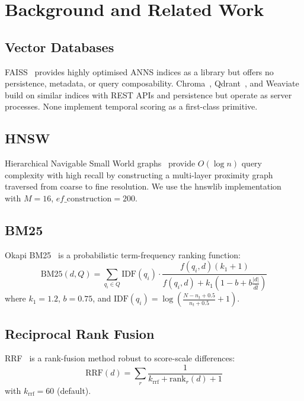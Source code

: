 \documentclass[11pt,twocolumn]{article}
\begin{document}
\section{Background and Related Work}
\label{sec:related}

\subsection{Vector Databases}

FAISS~\citep{johnson2019} provides highly optimised ANNS indices as a library but
offers no persistence, metadata, or query composability. Chroma~\citep{chroma2022},
Qdrant~\citep{qdrant2021}, and Weaviate~\citep{weaviate2021} build on similar
indices with REST APIs and persistence but operate as server processes.
None implement temporal scoring as a first-class primitive.

\subsection{HNSW}

Hierarchical Navigable Small World graphs~\citep{malkov2018} provide $O(\log n)$
query complexity with high recall by constructing a multi-layer proximity graph
traversed from coarse to fine resolution. We use the hnswlib
implementation~\citep{hnswlib} with $M=16$, $ef\_\text{construction}=200$.

\subsection{BM25}

Okapi BM25~\citep{robertson2009} is a probabilistic term-frequency ranking function:
\begin{equation}
  \text{BM25}(d,Q) = \sum_{q_i \in Q} \text{IDF}(q_i) \cdot
  \frac{f(q_i,d)(k_1+1)}{f(q_i,d)+k_1\!\left(1-b+b\frac{|d|}{\overline{dl}}\right)}
  \label{eq:bm25}
\end{equation}
where $k_1=1.2$, $b=0.75$, and $\text{IDF}(q_i)=\log\!\left(\frac{N-n_t+0.5}{n_t+0.5}+1\right)$.

\subsection{Reciprocal Rank Fusion}

RRF~\citep{cormack2009} is a rank-fusion method robust to score-scale differences:
\begin{equation}
  \text{RRF}(d) = \sum_r \frac{1}{k_{\text{rrf}} + \text{rank}_r(d) + 1}
  \label{eq:rrf}
\end{equation}
with $k_{\text{rrf}}=60$ (default).
\end{document}
